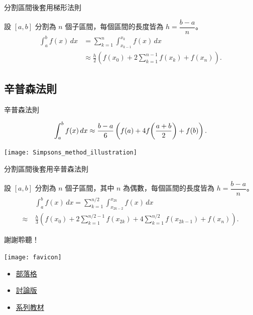 \documentclass{beamer}
\newcommand{\Left} {\mathopen{}\mathclose\bgroup\left}
\newcommand{\Right}{\aftergroup\egroup\right}
\theoremstyle{remark}
\begin{document}
\begin{CJK}{UTF8}{bsmi}
\begin{frame}{分割區間後套用梯形法則}
  \begin{theorem}
    設 $[a,b]$ 分割為 $n$ 個子區間，每個區間的長度皆為 $h = \dfrac{b-a}{n}$。
    \begin{align*}
      \int_a^b f(x)\,dx &= \sum_{k=1}^{n} \int_{x_{k-1}}^{x_{k}} f(x)\,dx\\
	&\approx \frac{h}{2} \left( f(x_0) + 2 \sum_{k=1}^{n-1} f(x_{k}) + f(x_n) \right).
    \end{align*}
  \end{theorem}
\end{frame}

\subsection{辛普森法則}
\begin{frame}{辛普森法則}
  \begin{theorem}
    \[\int_a^b f(x)\,dx \approx \frac{b-a}{6} \left( f(a) + 4f \Left( \frac{a+b}{2} \Right) + f(b) \right).\]
  \end{theorem}
  \begin{center}
    \texttt{[image: Simpsons\_method\_illustration]}
  \end{center}
\end{frame}

\begin{frame}{分割區間後套用辛普森法則}
  \begin{theorem}
    設 $[a,b]$ 分割為 $n$ 個子區間，其中 $n$ 為偶數，每個區間的長度皆為 $h = \dfrac{b-a}{n}$。
    \begin{align*}
      &\:\int_a^b f(x)\,dx = \sum_{k=1}^{n/2} \int_{x_{2k - 2}}^{x_{2k}} f(x)\,dx\\
      \approx&\: \frac{h}{3} \left( f(x_0) + 2 \sum_{k=1}^{n/2 - 1} f(x_{2k}) + 4 \sum_{k=1}^{n/2} f(x_{2k - 1}) + f(x_n)
	  \right).
    \end{align*}
  \end{theorem}
\end{frame}

\begin{frame}{謝謝聆聽！}
  \begin{center}
    \texttt{[image: favicon]}
  \end{center}
  \begin{itemize}
    \item \href{http://jdh8.org/}{部落格}
    \item \href{http://boards.jdh8.org/cal/}{討論版}
    \item \href{https://github.com/jdh8/calculus-2012}{系列教材}
  \end{itemize}
\end{frame}
\end{CJK}
\end{document}
